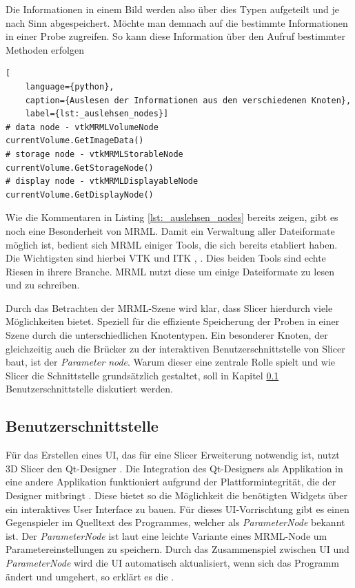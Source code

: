 Die Informationen in einem Bild werden also über dies Typen aufgeteilt und je
nach Sinn abgespeichert. Möchte man demnach auf die bestimmte Informationen in einer
Probe zugreifen. So kann diese Information über den Aufruf bestimmter Methoden
erfolgen

\begin{lstlisting}[
	language={python},
	caption={Auslesen der Informationen aus den verschiedenen Knoten},
	label={lst:_auslehsen_nodes}]
# data node - vtkMRMLVolumeNode
currentVolume.GetImageData()
# storage node - vtkMRMLStorableNode
currentVolume.GetStorageNode()
# display node - vtkMRMLDisplayableNode
currentVolume.GetDisplayNode()
\end{lstlisting}

Wie die Kommentaren in Listing \ref{lst:_auslehsen_nodes} bereits zeigen, gibt es
noch eine Besonderheit von \ac{MRML}. Damit ein Verwaltung aller Dateiformate möglich
ist, bedient sich \ac{MRML} einiger Tools, die sich bereits etabliert haben. Die
Wichtigsten sind hierbei \ac{VTK} und \ac{ITK} \citep[vgl.][K.~1.1]{vtk2006}, \citep[vgl.][K.~1.1]{itkguide2015}.
Dies beiden Tools sind echte Riesen in ihrere Branche. \ac{MRML} nutzt diese um einige
Dateiformate zu lesen und zu schreiben.

Durch das Betrachten der \ac{MRML}-Szene wird klar, dass Slicer hierdurch viele Möglichkeiten
bietet. Speziell für die effiziente Speicherung der Proben in einer Szene durch
die unterschiedlichen Knotentypen. Ein besonderer Knoten, der gleichzeitig auch
die Brücker zu der interaktiven Benutzerschnittstelle von Slicer baut, ist der \textit{Parameter
node}. Warum dieser eine zentrale Rolle spielt und wie Slicer die Schnittstelle grundsätzlich
gestaltet, soll in Kapitel \ref{subsec:benutzerschnitstelle}
Benutzerschnittstelle diskutiert werden.

\subsection{Benutzerschnittstelle}
\label{subsec:benutzerschnitstelle} Für das Erstellen eines \ac{UI}, das für
eine Slicer Erweiterung notwendig ist, nutzt 3D Slicer den Qt-Designer \citep[vgl.][Ab.~Einführung]{qt2024}.
Die Integration des Qt-Designers als Applikation in eine andere Applikation funktioniert
aufgrund der Plattformintegrität, die der Designer mitbringt \citep[vgl.][Ab.~Einführung]{qt2024}.
Diese bietet so die Möglichkeit die benötigten Widgets über ein interaktives
User Interface zu bauen. Für dieses \ac{UI}-Vorrischtung gibt es einen
Gegenspieler im Quelltext des Programmes, welcher als \textit{ParameterNode}
bekannt ist. Der \textit{ParameterNode} ist laut \citet{slicer2024} eine leichte
Variante eines \ac{MRML}-Node um Parametereinstellungen zu speichern. Durch das Zusammenspiel
zwischen \ac{UI} und \textit{ParameterNode} wird die \ac{UI} automatisch
aktualisiert, wenn sich das Programm ändert und umgehert, so erklärt es die
\citet{slicer2024}.

